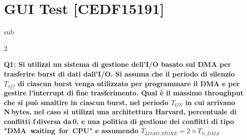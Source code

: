 \documentclass[10pt]{article}
\begin{document}
\section*{GUI Test \footnotesize [CEDF15191]}
{\footnotesize sub}
\begin{multicols}{2}

\textbf{Q1: Si utilizzi un sistema di gestione dell’I/O basato sul DMA per trasferire burst di dati dall’I/O. Si assuma che il periodo di silenzio $T_{off}$ di ciascun burst venga utilizzato per programmare il DMA e per gestire l’interrupt di fine trasferimento. Qual è il massimo throughput che si può smaltire in ciascun burst, nel periodo $T_{ON}$ in cui arrivano N bytes, nel caso si utilizzi una architettura Harvard, percentuale di conflitti f diversa da 0, e una politica di gestione dei conflitti di tipo "DMA waiting for CPU" e assumendo $T_{LOAD\_STORE} = 2 \times T_{tr\_DMA}$}

\begin{enumerate}[label=\arabic*.]
\item Nessuna delle altre opzioni
\item $0.5 \times \frac{N,s+ 2\times f \times N + N} \times \frac{1,T_{tr\_DMA}} $
\item $\frac{N,s+ 2\times f \times N + N} \times \frac{1,T_{tr\_DMA}} $
\item $\frac{1}{T_{tr\_DMA}$
\end{enumerate}
\end{multicols}
\end{document}
